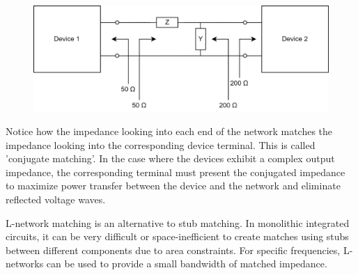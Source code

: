 \documentclass{article}
\begin{document}
\begin{figure}[ht!]
\begin{center}
    \includegraphics[width=0.7\linewidth]{figures/device.png}
\end{center}
\end{figure}

Notice how the impedance looking into each end of the network matches the impedance looking into the corresponding device terminal. This is called 'conjugate matching'. In the case where the devices exhibit a complex output impedance, the corresponding terminal must present the conjugated impedance to maximize power transfer between the device and the network and eliminate reflected voltage waves.
\vspace{3mm}

L-network matching is an alternative to stub matching. In monolithic integrated circuits, it can be very difficult or space-inefficient to create matches using stubs between different components due to area constraints. For specific frequencies, L-networks can be used to provide a small bandwidth of matched impedance. 
\end{document}

